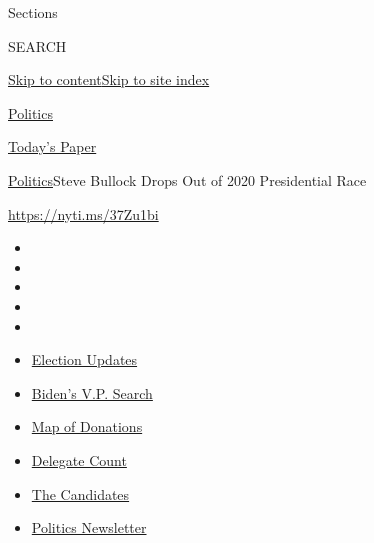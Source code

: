 Sections

SEARCH

\protect\hyperlink{site-content}{Skip to
content}\protect\hyperlink{site-index}{Skip to site index}

\href{https://www.nytimes.com/section/politics}{Politics}

\href{https://myaccount.nytimes.com/auth/login?response_type=cookie\&client_id=vi}{}

\href{https://www.nytimes.com/section/todayspaper}{Today's Paper}

\href{/section/politics}{Politics}\textbar{}Steve Bullock Drops Out of
2020 Presidential Race

\url{https://nyti.ms/37Zu1bi}

\begin{itemize}
\item
\item
\item
\item
\item
\end{itemize}

\begin{itemize}
\item
  \href{https://www.nytimes.com/2020/07/31/us/elections/biden-vs-trump.html?action=click\&pgtype=Article\&state=default\&region=TOP_BANNER\&context=storylines_menu}{Election
  Updates}
\item
  \href{https://www.nytimes.com/article/biden-vice-president-2020.html?action=click\&pgtype=Article\&state=default\&region=TOP_BANNER\&context=storylines_menu}{Biden's
  V.P. Search}
\item
  \href{https://www.nytimes.com/interactive/2020/07/24/us/politics/trump-biden-campaign-donors.html?action=click\&pgtype=Article\&state=default\&region=TOP_BANNER\&context=storylines_menu}{Map
  of Donations}
\item
  \href{https://www.nytimes.com/interactive/2020/us/elections/delegate-count-primary-results.html?action=click\&pgtype=Article\&state=default\&region=TOP_BANNER\&context=storylines_menu}{Delegate
  Count}
\item
  \href{https://www.nytimes.com/interactive/2019/us/politics/2020-presidential-candidates.html?action=click\&pgtype=Article\&state=default\&region=TOP_BANNER\&context=storylines_menu}{The
  Candidates}
\item
  \href{https://www.nytimes.com/newsletters/politics?action=click\&pgtype=Article\&state=default\&region=TOP_BANNER\&context=storylines_menu}{Politics
  Newsletter}
\end{itemize}


